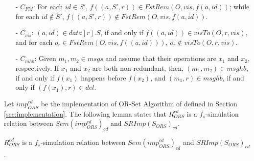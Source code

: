 \begin{itemize}
\item[-] $C_{\mathit{FM}}$: For each $\mathit{id} \in S'$, $f((a,S',r)) \in \mathit{FstRem}(O,\mathit{vis},f(a,\mathit{id}))$; while for each $\mathit{id} \notin S'$, $f((a,S',r)) \notin \mathit{FstRem}(O,\mathit{vis},f(a,\mathit{id}))$.

\item[-] $C_{\mathit{vis}}$: $(a,\mathit{id}) \in data[r].S$, if and only if $f((a,\mathit{id})) \in \mathit{visTo}(O,r,\mathit{vis})$, and for each $o_r \in \mathit{FstRem}(O,\mathit{vis},f((a,\mathit{id})))$, $o_r \notin \mathit{visTo}(O,r,\mathit{vis})$.

\item[-] $C_{\mathit{mhb}}$: Given $m_1,m_2 \in \mathit{msgs}$ and assume that their operations are $x_1$ and $x_2$, respectively. If $x_1$ and $x_2$ are both non-redundant, then, $(m_1,m_2) \in \mathit{msghb}$, if and only if $f(x_1)$ happens before $f(x_2)$, and $(m_1,r) \in \mathit{msghb}$, if and only if $(f(x_1),r) \in \mathit{del}$.
\end{itemize}


Let $\mathit{imp}_{\mathit{ORS}}^{cd}$ be the implementation of OR-Set Algorithm of \cite{Shapiro:2011} defined in Section \ref{sec:implementation}. The following lemma states that $R_{\mathit{ORS}}^{\mathit{cd}}$ is a $f_s$-simulation relation between $\mathit{Sem}( \mathit{imp}_{\mathit{ORS}}^{cd} )_{\mathit{cd}}$ and $\mathit{SRImp}(S_{\mathit{ORS}})_{\mathit{cd}}$.


\begin{lemma}
\label{lemma:ROrscd is a fs simulation between orset causal delivery algorithm and orset specification}
$R_{\mathit{ORS}}^{\mathit{cd}}$ is a $f_s$-simulation relation between $\mathit{Sem}( \mathit{imp}_{\mathit{ORS}}^{cd} )_{\mathit{cd}}$ and $\mathit{SRImp}(S_{\mathit{ORS}})_{\mathit{cd}}$.
\end{lemma}

